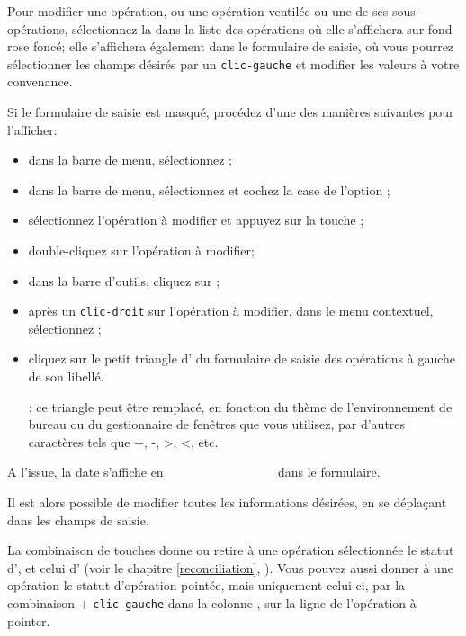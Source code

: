 Pour modifier une opération, ou une opération ventilée ou une de ses sous-opérations, sélectionnez-la dans la liste des opérations où elle s'affichera sur \colorbox[RGB]{245,155,155}{fond rose foncé}; elle s'affichera également dans le formulaire de saisie, où vous pourrez sélectionner les champs désirés par un \texttt{clic-gauche} et modifier les valeurs à votre convenance.%

\vspace{2mm}
Si le formulaire de saisie est masqué, procédez d'une des manières suivantes pour l'afficher:
\begin{itemize}
	\item dans la barre de menu, sélectionnez ;
	\item dans la barre de menu, sélectionnez  et cochez la case de l'option ;
	\item sélectionnez l'opération à modifier et appuyez sur la touche ;
	\item double-cliquez sur l'opération à modifier;
	\item dans la barre d'outils, cliquez sur ;
	\item après un \texttt{clic-droit} sur l'opération à modifier, dans le menu contextuel, sélectionnez ;
	\item cliquez sur le petit triangle d' du formulaire de saisie des opérations à gauche de son libellé.
	
	\Note{}: ce triangle peut être remplacé, en fonction du thème de l'environnement de bureau ou du gestionnaire de fenêtres que vous utilisez, par d'autres caractères tels que +, -, >, <, etc.
\end{itemize}
  
A l'issue, la date s'affiche en \colorbox[RGB]{61,174,233}{\textcolor{white}{\textsf{blanc sur fond bleu}}} dans le formulaire.

Il est alors possible de modifier toutes les informations désirées, en se déplaçant dans les champs de saisie.

La combinaison de touches  donne ou retire à une opération sélectionnée le statut d', et  celui d' (voir le chapitre \vref{reconciliation}, ). Vous pouvez aussi donner à une opération le statut d'opération pointée, mais uniquement celui-ci, par la combinaison  + \texttt{clic gauche} dans la colonne , sur la ligne de l'opération à pointer.

